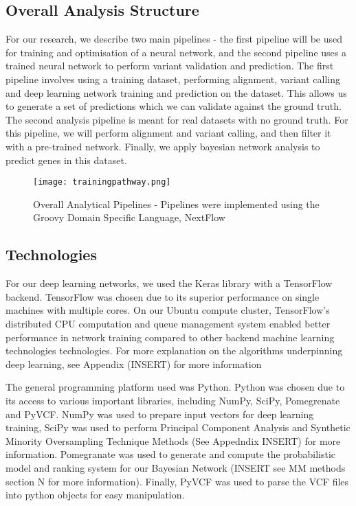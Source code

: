 \documentclass{article}
\begin{document}
\subsection{Overall Analysis Structure}
For our research, we describe two main pipelines - the first pipeline will be used for training and optimisation of a neural network, and the second pipeline uses a trained neural network to perform variant validation and prediction. The first pipeline involves using a training  dataset, performing alignment, variant calling and deep learning network training and prediction on the dataset. This allows us to generate a set of predictions which we can validate against the ground truth. The second analysis pipeline is meant for real datasets with no ground truth. For this pipeline, we will perform alignment and variant calling, and then filter it with a pre-trained network. Finally, we apply bayesian network analysis to predict genes in this dataset.

\begin{figure}[H]
\texttt{[image: trainingpathway.png]}
\centering
\caption{Overall Analytical Pipelines - Pipelines were implemented using the Groovy Domain Specific Language, NextFlow}
\end{figure}


\subsection{Technologies}
For our deep learning networks, we used the Keras library with a TensorFlow backend. TensorFlow was chosen due to its superior performance on single machines with multiple cores. On our Ubuntu compute cluster, TensorFlow's distributed CPU computation and queue management system enabled better performance in network training compared to other backend machine learning technologies technologies. For more explanation on the algorithms underpinning deep learning, see Appendix (INSERT) for more information 

The general programming platform used was Python. Python was chosen due to its access to various important libraries, including NumPy, SciPy, Pomegrenate and PyVCF. NumPy was used to prepare input vectors for deep learning training, SciPy was used to perform Principal Component Analysis and Synthetic Minority Oversampling Technique Methods (See Appedndix INSERT) for more information. Pomegranate was used to generate and compute the probabilistic model and ranking system for our Bayesian Network (INSERT see MM methods section N for more information). Finally, PyVCF was used to parse the VCF files into python objects for easy manipulation.
\end{document}
